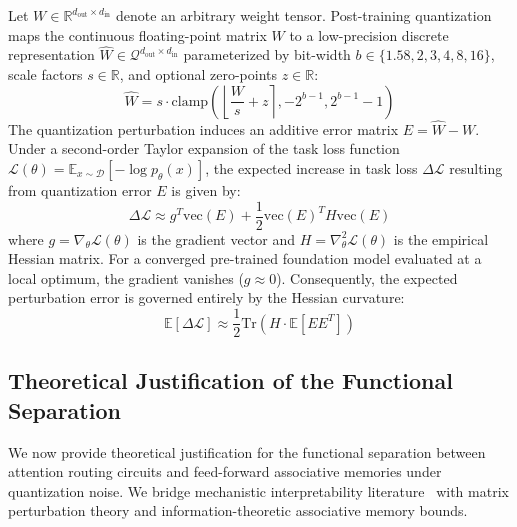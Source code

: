 \documentclass[10pt,twocolumn,letterpaper]{article}
\newcommand{\E}{\mathbb{E}}
\newcommand{\R}{\mathbb{R}}
\begin{document}
Let $W \in \R^{d_{\text{out}} \times d_{\text{in}}}$ denote an arbitrary weight tensor. Post-training quantization maps the continuous floating-point matrix $W$ to a low-precision discrete representation $\widehat{W} \in \mathcal{Q}^{d_{\text{out}} \times d_{\text{in}}}$ parameterized by bit-width $b \in \{1.58, 2, 3, 4, 8, 16\}$, scale factors $s \in \R$, and optional zero-points $z \in \R$:
\begin{equation}
    \widehat{W} = s \cdot \text{clamp}\left( \left\lfloor \frac{W}{s} + z \right\rceil, -2^{b-1}, 2^{b-1}-1 \right)
\end{equation}
The quantization perturbation induces an additive error matrix $E = \widehat{W} - W$. Under a second-order Taylor expansion of the task loss function $\mathcal{L}(\theta) = \E_{x \sim \mathcal{D}} [-\log p_\theta(x)]$, the expected increase in task loss $\Delta \mathcal{L}$ resulting from quantization error $E$ is given by:
\begin{equation}
    \Delta \mathcal{L} \approx g^T \text{vec}(E) + \frac{1}{2} \text{vec}(E)^T H \text{vec}(E)
\end{equation}
where $g = \nabla_\theta \mathcal{L}(\theta)$ is the gradient vector and $H = \nabla_\theta^2 \mathcal{L}(\theta)$ is the empirical Hessian matrix. For a converged pre-trained foundation model evaluated at a local optimum, the gradient vanishes ($g \approx 0$). Consequently, the expected perturbation error is governed entirely by the Hessian curvature:
\begin{equation}
    \E[\Delta \mathcal{L}] \approx \frac{1}{2} \text{Tr}\left( H \cdot \E[E E^T] \right)
    \label{eq:hessian_loss}
\end{equation}

\subsection{Theoretical Justification of the Functional Separation}
\label{sec:math_proof}
We now provide theoretical justification for the functional separation between attention routing circuits and feed-forward associative memories under quantization noise. We bridge mechanistic interpretability literature~\cite{geva2021transformer,meng2022locating,olsson2022incontext} with matrix perturbation theory and information-theoretic associative memory bounds.
\end{document}
